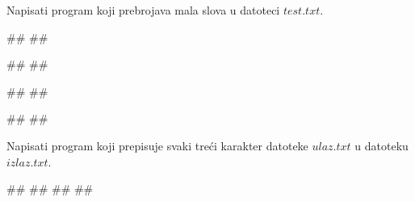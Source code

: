 \begin{Exercise}[label=p3_01] 
Napisati program koji prebrojava mala slova u datoteci $test.txt$. 

\begin{miditest}
\begin{upotreba}{1}
##
##

#\naslovIzlaz#
##
\end{upotreba}
\end{miditest}
\begin{miditest}
\begin{upotreba}{2}
##
##

#\naslovIzlaz#
##
\end{upotreba}
\end{miditest}
\end{Exercise}
\ifresenja
\begin{Answer}[ref=p3_01]
\end{Answer}
\fi

\begin{Exercise}[label=p3_02] 
Napisati program koji prepisuje svaki treći karakter datoteke $ulaz.txt$ u datoteku $izlaz.txt$.\\
\begin{miditest}
\begin{upotreba}{1}
##
##
##
##
\end{upotreba}
\end{miditest}

\end{Exercise}
\ifresenja
\begin{Answer}[ref=p3_02]
\end{Answer}
\fi

